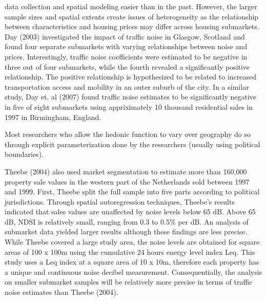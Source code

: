 \documentclass{article}\usepackage{graphicx, color}
\begin{document}
 data collection and spatial modeling easier than in the past. However, the larger sample sizes and spatial extents create issues of heterogeneity as the relationship between characteristics and housing prices may differ across housing submarkets.   Day (2003) investigated the impact of traffic noise in Glasgow, Scotland and found four separate submarkets with varying relationships between noise and prices. Interestingly, traffic noise coefficients were estimated to be negative in three out of four submarkets, while the fourth revealed a significantly positive relationship. The positive relationship is hypothesized to be related to increased transportation access and mobility in an outer suburb of the city. In a similar study, Day et. al (2007) found traffic noise estimates to be significantly negative in five of eight submarkets using appriximately 10 thousand residential sales in 1997 in Birmingham, England.  

Most researchers who allow the hedonic function to vary over geography do so through explicit parameterization done by the researchers (usually using political boundaries).

Theebe (2004) also used market segmentation to estimate more than 160,000 property sale values in the western part of the Netherlands sold between 1997 and 1999.  First, Theebe split the full sample into five parts according to political jurisdictions. Through spatial autoregression techniques, Theebe’s results indicated that sales values are unaffected by noise levels below 65 dB. Above 65 dB, NDSI is relatively small, ranging from 0.3 to 0.5\% per dB. An analysis of submarket data yielded larger results although these findings are less precise. While Theebe covered a large study area, the noise levels are obtained for square areas of 100 x 100m using the cumulative 24 hours energy level index Leq. This study uses a Leq index at a square area of 10 x 10m, therefore each property has a unique and continuous noise decibel measurement. Consequentially, the analysis on smaller submarket samples will be relatively more precise in terms of traffic noise estimates than Theebe (2004).
\end{document}
